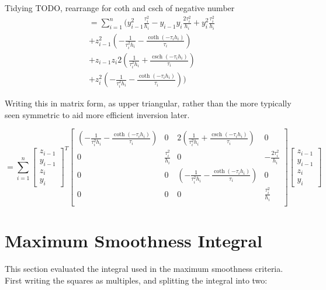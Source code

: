 \documentclass{article}
\DeclareMathOperator{\csch}{csch}
\begin{document}
Tidying
TODO, rearrange for coth and csch of negative number
\begin{multline}
    = \sum_{i=1}^{n} \biggl( y_{i-1}^2\frac{\tau_i^2}{h_i} 
    - y_{i-1} y_i\frac{2 \tau_i^2}{h_i}
    + y_i^2\frac{\tau_i^2}{h_i} \\
    +z_{i-1}^2 \left(-\frac{1}{ \tau_i^2 h_i}-\frac{\coth (-\tau_i h_i)}{\tau_i} \right) \\
    +z_{i-1} z_i 2 \left(\frac{1}{\tau_i^2 h_i}+\frac{\csch(-\tau_i h_i)}{\tau_i}\right) \\
    +z_i^2 \left(-\frac{1}{\tau_i ^2 h_i}-\frac{\coth (-\tau_i h_i)}{\tau_i} \right) \biggr)
\end{multline}

Writing this in matrix form, as upper triangular, rather than the more typically seen symmetric
to aid more efficient inversion later.

\begin{equation}
    = \sum_{i=1}^{n} \begin{bmatrix}
        z_{i-1} \\ y_{i-1} \\ z_i \\ y_i
    \end{bmatrix}^T
    \begin{bmatrix}
        \left(-\frac{1}{ \tau_i^2 h_i}-\frac{\coth (-\tau_i h_i)}{\tau_i} \right) & 0 & 2 \left(\frac{1}{\tau_i^2 h_i}+\frac{\csch(-\tau_i h_i)}{\tau_i}\right) & 0 \\
        0 & \frac{\tau_i^2}{h_i} & 0 & -\frac{2 \tau_i^2}{h_i} \\
        0 & 0 & \left(-\frac{1}{\tau_i ^2 h_i}-\frac{\coth (-\tau_i h_i)}{\tau_i} \right) & 0 \\
        0 & 0 & 0 & \frac{\tau_i^2}{h_i} \\
    \end{bmatrix}
    \begin{bmatrix}
        z_{i-1} \\ y_{i-1} \\ z_i \\ y_i
    \end{bmatrix}
\end{equation}

\newpage
\appendix
\appendixpage
\section{Maximum Smoothness Integral}
\label{appendix:max_smooth_integral}
This section evaluated the integral used in the maximum smoothness criteria. First writing
the squares as multiples, and splitting the integral into two:
\end{document}
